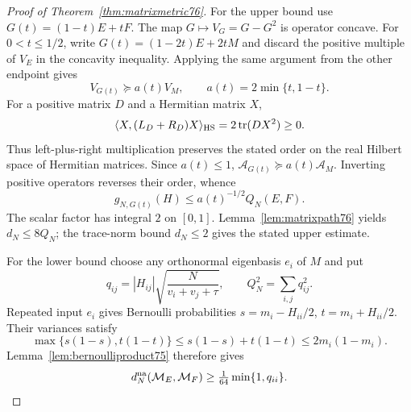 \begin{proof}[Proof of Theorem~\ref{thm:matrixmetric76}]
For the upper bound use $G(t)=(1-t)E+tF$.  The map
$G\mapsto V_G=G-G^2$ is operator concave.  For $0<t\le1/2$,
write $G(t)=(1-2t)E+2tM$ and discard the positive multiple of
$V_E$ in the concavity inequality.  Applying the same argument
from the other endpoint gives
\begin{equation}\label{eq:midpointvariance76}
 V_{G(t)}\succeq a(t)V_M,\qquad
             a(t)=2\min\{t,1-t\}.
\end{equation}
For a positive matrix $D$ and a Hermitian matrix $X$,
\[
 \langle X,(L_D+R_D)X\rangle_{\rm HS}
       =2\operatorname{tr}(DX^2)\ge0.
\]
Thus left-plus-right multiplication preserves the stated order on the
real Hilbert space of Hermitian matrices.  Since $a(t)\le1$,
$\mathcal A_{G(t)}\succeq a(t)\mathcal A_M$.
Inverting positive operators reverses their order, whence
\[
 g_{N,G(t)}(H)\le a(t)^{-1/2}Q_N(E,F).
\]
The scalar factor has integral $2$ on $[0,1]$.
Lemma~\ref{lem:matrixpath76} yields $d_N\le8Q_N$;
the trace-norm bound $d_N\le2$ gives the stated upper estimate.

For the lower bound choose any orthonormal eigenbasis $e_i$ of
$M$ and put
\begin{equation}\label{eq:matrixentries76}
 q_{ij}=|H_{ij}|\sqrt{\frac N{v_i+v_j+\tau}},
                 \qquad Q_N^2=\sum_{i,j}q_{ij}^2.
\end{equation}
Repeated input $e_i$ gives Bernoulli probabilities
$s=m_i-H_{ii}/2$, $t=m_i+H_{ii}/2$.  Their variances satisfy
\[
 \max\{s(1-s),t(1-t)\}
 \le s(1-s)+t(1-t)\le2m_i(1-m_i).
\]
Lemma~\ref{lem:bernoulliproduct75} therefore gives
\begin{equation}\label{eq:matrixdiagonallower76}
 d_N^{\rm na}(\mathcal M_E,\mathcal M_F)
                            \ge\tfrac1{64}\min\{1,q_{ii}\}.
\end{equation}


\end{proof}
